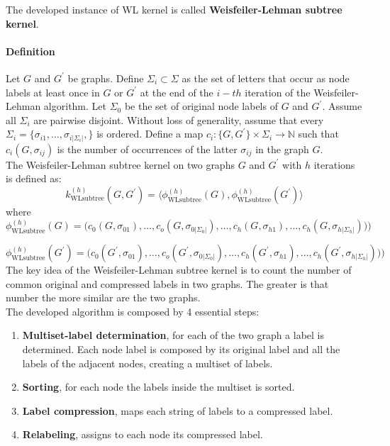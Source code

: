 \documentclass[11pt,a4paper]{article}
\begin{document}
The developed instance of WL kernel is called \textbf{Weisfeiler-Lehman subtree kernel}.

\paragraph{Definition} Let $G$ and $G^\prime$ be graphs. Define $\Sigma_i \subset \Sigma$ as the set of letters that occur as node labels at least once in $G$ or $G^\prime$ at the end of the $i-th$ iteration of the Weisfeiler-Lehman algorithm. Let $\Sigma_0$ be the set of original node labels of $G$ and $G^\prime$. Assume all $\Sigma_i$ are pairwise disjoint. Without loss of generality, assume that every $\Sigma_i = \big\{\sigma_{i1},\dots,\sigma_{i|\Sigma_i|},\big\}$ is ordered. Define a map $c_i: \big\{G,G^\prime\big\} \times \Sigma_i \rightarrow \mathbb{N}$ such that $c_i(G,\sigma_{ij})$ is the number of occurrences of the latter $\sigma_{ij}$ in the graph $G$. \\
The Weisfeiler-Lehman subtree kernel on two graphs $G$ and $G^\prime$ with $h$ iterations is defined as:
$$ k^{(h)}_{\text{WLsubtree}}(G,G^\prime) = \langle \phi^{(h)}_{\text{WLsubtree}}(G), \phi^{(h)}_{\text{WLsubtree}}(G^\prime) \rangle$$
where
$$\phi^{(h)}_{\text{WLsubtree}}(G) = \big(c_0(G,\sigma_{01}),\dots,c_o(G,\sigma_{0|\Sigma_0|}), \dots, c_h(G,\sigma_{h1}), \dots, c_h(G,\sigma_{h|\Sigma_h|})  )\big)$$


$$\phi^{(h)}_{\text{WLsubtree}}(G^\prime) = \big(c_0(G^\prime,\sigma_{01}),\dots,c_o(G^\prime,\sigma_{0|\Sigma_0|}), \dots, c_h(G^\prime,\sigma_{h1}), \dots, c_h(G^\prime,\sigma_{h|\Sigma_h|})  )\big)$$
The key idea of the Weisfeiler-Lehman subtree kernel is to count the number of common original and compressed labels in two graphs. The greater is that number the more similar are the two graphs.\\
The developed algorithm is composed by 4 essential steps:
\begin{enumerate}
	\item \textbf{Multiset-label determination}, for each of the two graph a label is determined. Each node label is composed by its original label and all the labels of the adjacent nodes, creating a multiset of labels.
	\item \textbf{Sorting}, for each node the labels inside the multiset is sorted.
	\item \textbf{Label compression}, maps each string of labels to a compressed label.
	\item \textbf{Relabeling}, assigns to each node its compressed label.
\end{enumerate}
\end{document}
